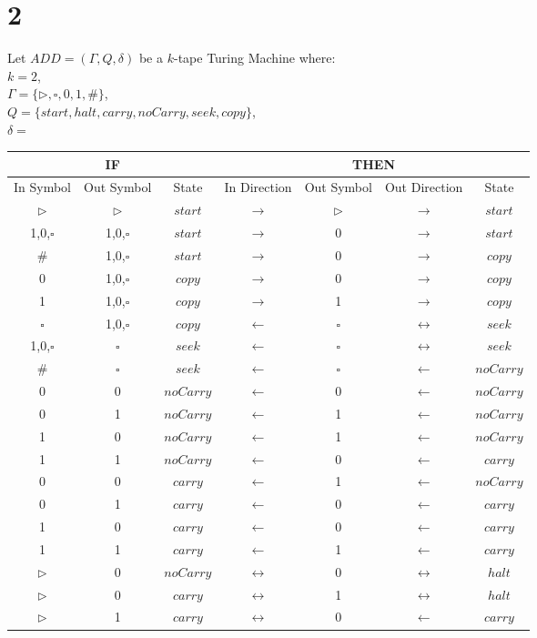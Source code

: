 \documentclass[letterpaper,notitlepage,twoside]{article}
\begin{document}
\section*{2}
Let $ADD = (\Gamma, Q, \delta)$ be a $k$-tape Turing Machine where:\\
$k = 2$,\\
$\Gamma = \{\triangleright, \square, 0, 1, \#\}$,\\
$Q = \{start, halt, carry, noCarry, seek, copy\}$,\\
$\delta = $\\
\begin{tabular}{*3c|*4c}
\toprule
\multicolumn{3}{c}{IF} & \multicolumn{4}{c}{THEN}\\
\midrule
In Symbol        & Out Symbol       & State   & In Direction  & Out Symbol       & Out Direction & State\\
\midrule
$\triangleright$ & $\triangleright$ & $start$ & $\rightarrow$ & $\triangleright$ & $\rightarrow$ & $start$\\
1,0,$\square$ & 1,0,$\square$ & $start$ & $\rightarrow$ & 0 & $\rightarrow$ & $start$\\
$\#$ & 1,0,$\square$ & $start$ & $\rightarrow$ & 0 & $\rightarrow$ & $copy$\\
0 & 1,0,$\square$ & $copy$ & $\rightarrow$ & 0 & $\rightarrow$ & $copy$\\
1 & 1,0,$\square$ & $copy$ & $\rightarrow$ & 1 & $\rightarrow$ & $copy$\\
$\square$ & 1,0,$\square$ & $copy$ & $\leftarrow$ & $\square$ & $\leftrightarrow$ & $seek$\\
1,0,$\square$ & $\square$ & $seek$ & $\leftarrow$ & $\square$ & $\leftrightarrow$ & $seek$\\
$\#$ & $\square$ & $seek$ & $\leftarrow$ & $\square$ & $\leftarrow$ & $noCarry$\\
0 & 0 & $noCarry$ & $\leftarrow$ & 0 & $\leftarrow$ & $noCarry$\\
0 & 1 & $noCarry$ & $\leftarrow$ & 1 & $\leftarrow$ & $noCarry$\\
1 & 0 & $noCarry$ & $\leftarrow$ & 1 & $\leftarrow$ & $noCarry$\\
1 & 1 & $noCarry$ & $\leftarrow$ & 0 & $\leftarrow$ & $carry$\\
0 & 0 & $carry$ & $\leftarrow$ & 1 & $\leftarrow$ & $noCarry$\\
0 & 1 & $carry$ & $\leftarrow$ & 0 & $\leftarrow$ & $carry$\\
1 & 0 & $carry$ & $\leftarrow$ & 0 & $\leftarrow$ & $carry$\\
1 & 1 & $carry$ & $\leftarrow$ & 1 & $\leftarrow$ & $carry$\\
$\triangleright$ & 0 & $noCarry$ & $\leftrightarrow$ & 0 & $\leftrightarrow$ & $halt$\\
$\triangleright$ & 0 & $carry$ & $\leftrightarrow$ & 1 & $\leftrightarrow$ & $halt$\\
$\triangleright$ & 1 & $carry$ & $\leftrightarrow$ & 0 & $\leftarrow$ & $carry$\\
\bottomrule
\end{tabular}\\\\\\
\end{document}
